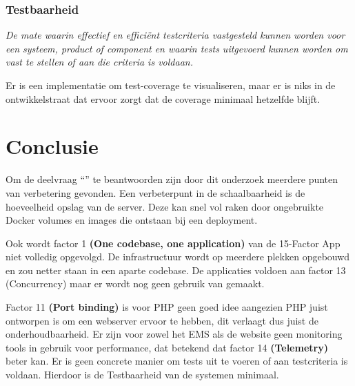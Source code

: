 \subsubsection{Testbaarheid}
\textit{De mate waarin effectief en efficiënt testcriteria vastgesteld kunnen worden voor een systeem, product of component en waarin tests uitgevoerd kunnen worden om vast te stellen of aan die criteria is voldaan.}

Er is een implementatie om test-coverage te visualiseren, maar er is niks in de ontwikkelstraat dat ervoor zorgt dat de coverage minimaal hetzelfde blijft. 

\section{Conclusie}
Om de deelvraag \enquote{\deelhuidig} te beantwoorden zijn door dit onderzoek meerdere punten van verbetering gevonden. Een verbeterpunt in de schaalbaarheid is de hoeveelheid opslag van de server. Deze kan snel vol raken door ongebruikte Docker volumes en images die ontstaan bij een deployment. 

Ook wordt factor 1 \textbf{(One codebase, one application)} van de 15-Factor App niet volledig opgevolgd. De infrastructuur wordt op meerdere plekken opgebouwd en zou netter staan in een aparte codebase. De applicaties voldoen aan factor 13 (Concurrency) maar er wordt nog geen gebruik van gemaakt. 

Factor 11 \textbf{(Port binding)} is voor PHP geen goed idee aangezien PHP juist ontworpen is om een webserver ervoor te hebben, dit verlaagt dus juist de onderhoudbaarheid. Er zijn voor zowel het EMS als de website geen monitoring tools in gebruik voor performance, dat betekend dat factor 14 \textbf{(Telemetry)} beter kan. Er is geen concrete manier om tests uit te voeren of aan testcriteria is voldaan. Hierdoor is de Testbaarheid van de systemen minimaal.